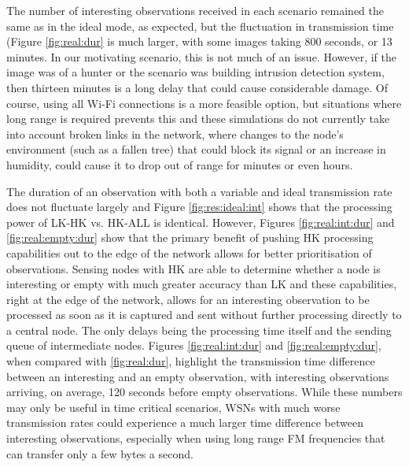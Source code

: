 The number of interesting observations received in each scenario remained the same as in the ideal mode, as expected, but the fluctuation in transmission time (Figure \ref{fig:real:dur} is much larger, with some images taking 800 seconds, or 13 minutes. In our motivating scenario, this is not much of an issue. However, if the image was of a hunter or the scenario was building intrusion detection system, then thirteen minutes is a long delay that could cause considerable damage. Of course, using all Wi-Fi connections is a more feasible option, but situations where long range is required prevents this and these simulations do not currently take into account broken links in the network, where changes to the node's environment (such as a fallen tree) that could block its signal or an increase in humidity, could cause it to drop out of range for minutes or even hours. 

The duration of an observation with both a variable and ideal transmission rate does not fluctuate largely and Figure \ref{fig:res:ideal:int} shows that the processing power of LK-HK vs. HK-ALL is identical. However, Figures \ref{fig:real:int:dur} and \ref{fig:real:empty:dur} show that the primary benefit of pushing HK processing capabilities out to the edge of the network allows for better prioritisation of observations. Sensing nodes with HK are able to determine whether a node is interesting or empty with much greater accuracy than LK and these capabilities, right at the edge of the network, allows for an interesting observation to be processed as soon as it is captured and sent without further processing directly to a central node. The only delays being the processing time itself and the sending queue of intermediate nodes. Figures \ref{fig:real:int:dur} and \ref{fig:real:empty:dur}, when compared with \ref{fig:real:dur}, highlight the transmission time difference between an interesting and an empty observation, with interesting observations arriving, on average, 120 seconds before empty observations. While these numbers may only be useful in time critical scenarios, WSNs with much worse transmission rates could experience a much larger time difference between interesting observations, especially when using long range FM frequencies that can transfer only a few bytes a second.

